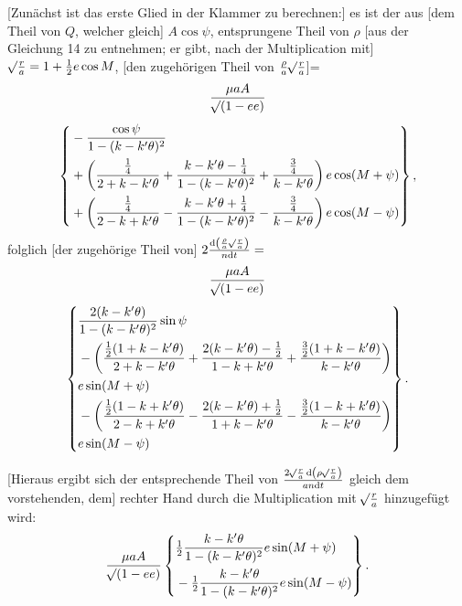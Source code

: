 [Zunächst ist das erste Glied in der Klammer zu berechnen:] es ist der aus [dem Theil von \(Q\), welcher gleich] \(A\cos\psi\), entsprungene Theil von \(\rho\) \hypertarget{native-394}{}[aus der Gleichung 14 zu entnehmen; er gibt, nach der Multiplication mit] \(\mathord{{}^{}\!\surd}\frac ra=1+\tfrac12e\cos M\), [den zugehörigen Theil von \(\frac\rho a\mathord{{}^{}\!\surd}\frac ra\)]=
\[
\begin{gathered}
\frac{\mu aA}{\mathord{{}^{}\!\surd}(1-ee)}\\[1ex]
\left\{\begin{aligned}
&-\frac{\cos\psi}{1-(k-k'\theta)^2}\\
&+\left(\frac{\tfrac14}{2+k-k'\theta}+\frac{k-k'\theta-\tfrac14}{1-(k-k'\theta)^2}+\frac{\tfrac34}{k-k'\theta}\right)e\cos(M+\psi)\\
&+\left(\frac{\tfrac14}{2-k+k'\theta}-\frac{k-k'\theta+\tfrac14}{1-(k-k'\theta)^2}-\frac{\tfrac34}{k-k'\theta}\right)e\cos(M-\psi)
\end{aligned}\right\},
\end{gathered}
\]
\noindent folglich [der zugehörige Theil von] \(2\frac{\mathrm{d}\left(\frac\rho a\mathord{{}^{}\!\surd}\frac ra\right)}{n\mathrm{d}t}=\)
\[
\begin{gathered}
\frac{\mu aA}{\BareRoot{(1-ee)}}\\[1ex]
\left\{\begin{aligned}
&\frac{2(k-k'\theta)}{1-(k-k'\theta)^2}\sin\psi\\
&-\left(\frac{\tfrac12(1+k-k'\theta)}{2+k-k'\theta}+\frac{2(k-k'\theta)-\tfrac12}{1-k+k'\theta}+\frac{\tfrac32(1+k-k'\theta)}{k-k'\theta}\right)\\
&\hfill e\sin(M+\psi)\\
&-\left(\frac{\tfrac12(1-k+k'\theta)}{2-k+k'\theta}-\frac{2(k-k'\theta)+\tfrac12}{1+k-k'\theta}-\frac{\tfrac32(1-k+k'\theta)}{k-k'\theta}\right)\\
&\hfill e\sin(M-\psi)
\end{aligned}\right\}.
\end{gathered}
\]

[Hieraus ergibt sich der entsprechende Theil von \(\frac{2\mathord{{}^{}\!\surd}\frac ra\,\mathrm{d}\left(\rho\mathord{{}^{}\!\surd}\frac ra\right)}{an\mathrm{d}t}\) gleich dem vorstehenden, dem] rechter Hand durch die Multiplication mit \(\mathord{{}^{}\!\surd}\frac ra\) hinzugefügt wird:
\[
\frac{\mu aA}{\mathord{{}^{}\!\surd}(1-ee)}\left\{\begin{aligned}
&\tfrac12\frac{k-k'\theta}{1-(k-k'\theta)^2}e\sin(M+\psi)\\
&-\tfrac12\frac{k-k'\theta}{1-(k-k'\theta)^2}e\sin(M-\psi)
\end{aligned}\right\}.
\]

